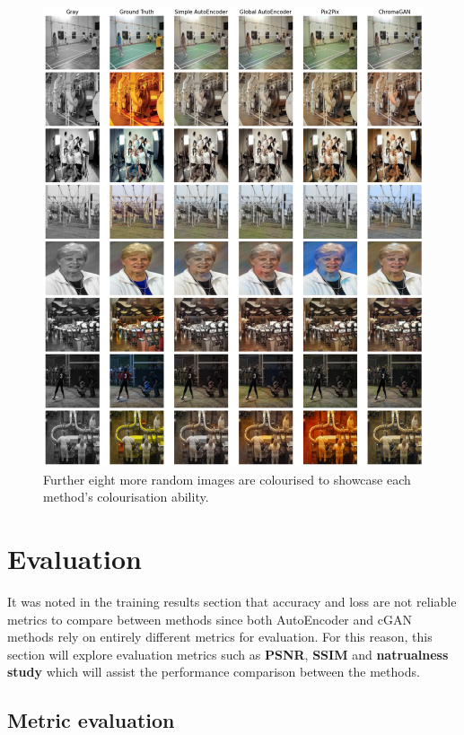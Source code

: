 \begin{figure}[H]
    \centering
    \includegraphics[width=1\columnwidth]{sections/figures/colourisation3.png}
    \caption{Further eight more random images are colourised to showcase each method's colourisation ability.}
    \label{fig:my_label}
\end{figure}



\section{Evaluation}
It was noted in the training results section that accuracy and loss are not reliable metrics to compare between methods since both AutoEncoder and cGAN methods rely on entirely different metrics for evaluation. For this reason, this section will explore evaluation metrics such as \textbf{PSNR}, \textbf{SSIM} and \textbf{natrualness study} which will assist the performance comparison between the methods. 
\subsection{Metric evaluation}
